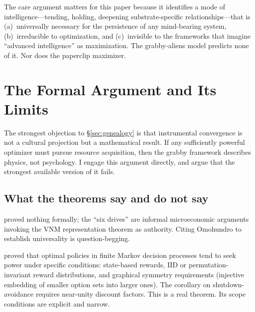 \documentclass[11pt,a4paper,twocolumn]{article}
\begin{document}
The care argument matters for this paper because it identifies a mode
of intelligence---tending, holding, deepening substrate-specific
relationships---that is (a)~universally necessary for the persistence
of any mind-bearing system, (b)~irreducible to optimization, and
(c)~invisible to the frameworks that imagine ``advanced intelligence''
as maximization. The grabby-aliens model predicts none of it. Nor does
the paperclip maximizer.


\section{The Formal Argument and Its Limits}
\label{sec:convergence}

The strongest objection to \S\ref{sec:genealogy} is that instrumental
convergence is not a cultural projection but a mathematical result. If
any sufficiently powerful optimizer must pursue resource acquisition,
then the grabby framework describes physics, not psychology. I engage
this argument directly, and argue that the strongest available version
of it fails.

\subsection{What the theorems say and do not say}

\citet{omohundro2008} proved nothing formally; the ``six drives'' are
informal microeconomic arguments invoking the VNM representation theorem
as authority. Citing Omohundro to establish universality is
question-begging.

\citet{turner2021} proved that optimal policies in finite Markov decision
processes tend to seek power under specific conditions: state-based
rewards, IID or permutation-invariant reward distributions, and
graphical symmetry requirements (injective embedding of smaller option
sets into larger ones). The corollary on shutdown-avoidance requires
near-unity discount factors. This is a real theorem. Its scope
conditions are explicit and narrow.
\end{document}
